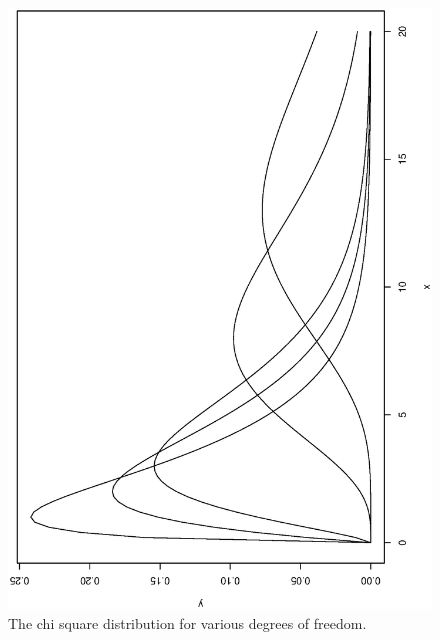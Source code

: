 \documentclass[captions=tableheading]{scrbook}
\begin{document}
\begin{figure}[th]
  \includegraphics[angle=270, totalheight=4in]{ps/contdist/chisq-dist-vary-df.ps}
  \caption[Chi square distribution for various degrees of freedom]{\small The chi square distribution for various degrees of freedom.}
  \label{fig-chisq-dist-vary-df}
\end{figure}
\end{document}
